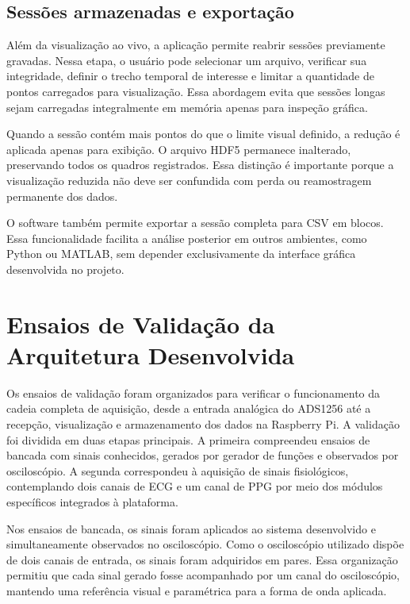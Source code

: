 \documentclass[a4paper,12pt]{fcte}
\begin{document}
\subsection{Sessões armazenadas e exportação}
\label{subsec:sessoes_exportacao_software}

Além da visualização ao vivo, a aplicação permite reabrir sessões previamente gravadas. Nessa etapa, o usuário pode selecionar um arquivo, verificar sua integridade, definir o trecho temporal de interesse e limitar a quantidade de pontos carregados para visualização. Essa abordagem evita que sessões longas sejam carregadas integralmente em memória apenas para inspeção gráfica.

Quando a sessão contém mais pontos do que o limite visual definido, a redução é aplicada apenas para exibição. O arquivo HDF5 permanece inalterado, preservando todos os quadros registrados. Essa distinção é importante porque a visualização reduzida não deve ser confundida com perda ou reamostragem permanente dos dados.

O software também permite exportar a sessão completa para CSV em blocos. Essa funcionalidade facilita a análise posterior em outros ambientes, como Python ou MATLAB, sem depender exclusivamente da interface gráfica desenvolvida no projeto.


\section{Ensaios de Validação da Arquitetura Desenvolvida}
\label{sec:procedimentos_aquisicao}

Os ensaios de validação foram organizados para verificar o funcionamento da cadeia completa de aquisição, desde a entrada analógica do ADS1256 até a recepção, visualização e armazenamento dos dados na Raspberry Pi. A validação foi dividida em duas etapas principais. A primeira compreendeu ensaios de bancada com sinais conhecidos, gerados por gerador de funções e observados por osciloscópio. A segunda correspondeu à aquisição de sinais fisiológicos, contemplando dois canais de ECG e um canal de PPG por meio dos módulos específicos integrados à plataforma.

Nos ensaios de bancada, os sinais foram aplicados ao sistema desenvolvido e simultaneamente observados no osciloscópio. Como o osciloscópio utilizado dispõe de dois canais de entrada, os sinais foram adquiridos em pares. Essa organização permitiu que cada sinal gerado fosse acompanhado por um canal do osciloscópio, mantendo uma referência visual e paramétrica para a forma de onda aplicada.
\end{document}
